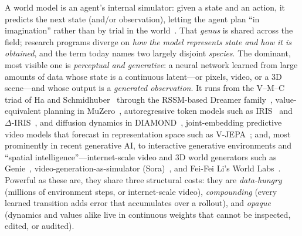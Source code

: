 \documentclass[11pt]{article}
\begin{document}
A world model is an agent's internal simulator: given a state and an action, it
predicts the next state (and/or observation), letting the agent plan ``in
imagination'' rather than by trial in the world~\cite{ha2018world}. That
\emph{genus} is shared across the field; research programs diverge on \emph{how the
model represents state and how it is obtained}, and the term today names two largely
disjoint \emph{species}. The dominant, most visible one is \emph{perceptual and
generative}: a neural network learned from large amounts of data whose state is a
continuous latent---or pixels, video, or a 3D scene---and whose output is a
\emph{generated observation}. It runs from the V--M--C triad of Ha and
Schmidhuber~\cite{ha2018world} through the RSSM-based Dreamer
family~\cite{dreamerv3}, value-equivalent planning in MuZero~\cite{muzero},
autoregressive token models such as IRIS~\cite{iris2023} and
$\Delta$-IRIS~\cite{deltairis2024}, and diffusion dynamics in
DIAMOND~\cite{diamond2024}, joint-embedding predictive video models that
forecast in representation space such as V-JEPA~\cite{vjepa2025}; and, most
prominently in recent generative AI, to interactive generative environments and
``spatial intelligence''---internet-scale video and 3D world generators such as
Genie~\cite{genie2024}, video-generation-as-simulator (Sora)~\cite{sora2024}, and
Fei-Fei Li's World Labs~\cite{worldlabs2025}. Powerful as these are, they share three structural
costs: they are \emph{data-hungry} (millions of environment steps, or
internet-scale video), \emph{compounding} (every learned transition adds error
that accumulates over a rollout), and \emph{opaque} (dynamics and values alike
live in continuous weights that cannot be inspected, edited, or audited).
\end{document}
